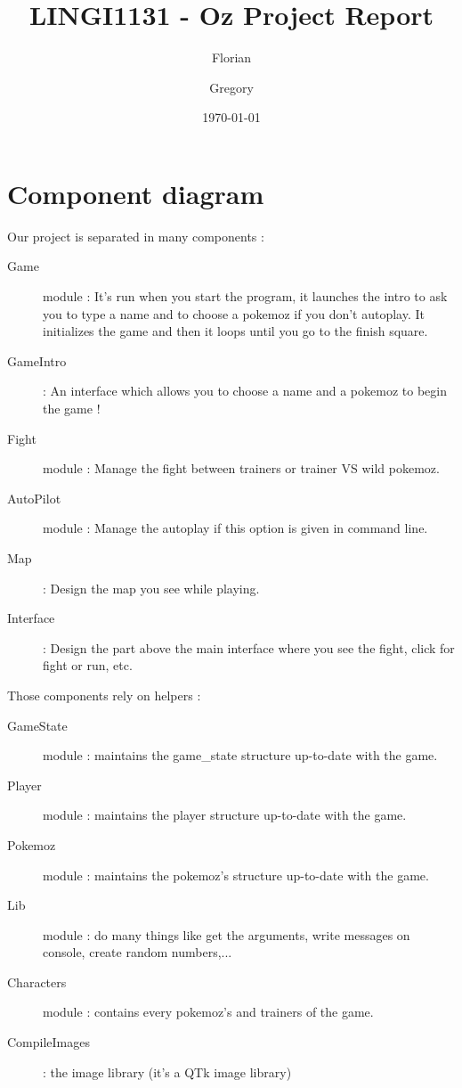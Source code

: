 \documentclass[12pt, a4paper]{article}
\author{Florian \bsc{Thuin} \and Gregory \bsc{Vander Schueren}}
\title{LINGI1131 - Oz Project Report}
\date{\today}
\begin{document}
\maketitle
\section{Component diagram}

Our project is separated in many \og{}components\fg{} :

\begin{description}
 \item[Game] module : It's run when you start the program, it launches the intro to ask you to type a name and to choose a pokemoz if you don't autoplay. It initializes the game and then it loops until you go to the finish square.
 
 \item[GameIntro] : An interface which allows you to choose a name and a pokemoz to begin the game !
 \item[Fight] module : Manage the fight between trainers or trainer VS wild pokemoz.
 \item[AutoPilot] module : Manage the autoplay if this option is given in command line.
 \item[Map] : Design the map you see while playing.
 \item[Interface] : Design the part above the main interface where you see the fight, click for fight or run, etc.

\end{description}

\bigskip

Those components rely on \og{}helpers\fg{} :

\begin{description}
 \item[GameState] module : maintains the game\_state structure up-to-date with the game.
 \item[Player] module : maintains the player structure up-to-date with the game.
 \item[Pokemoz] module : maintains the pokemoz's structure up-to-date with the game.
 \item[Lib] module : do many things like get the arguments, write messages on console, create random numbers,...
 \item[Characters] module : contains every pokemoz's and trainers of the game.
 \item[CompileImages] : the image library (it's a QTk image library)
 
\end{description}
\end{document}
